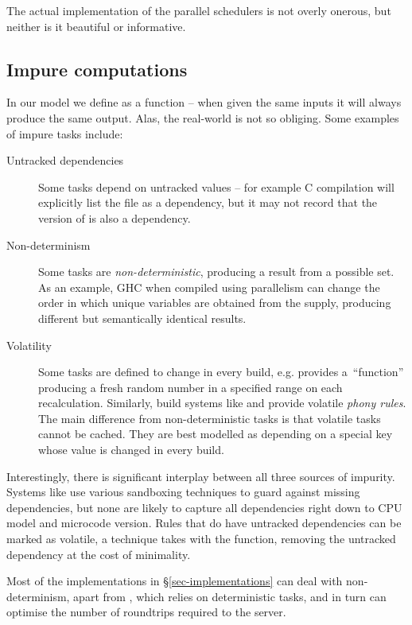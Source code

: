 The actual implementation of the parallel schedulers is not overly onerous,
but neither is it beautiful or informative.

\subsection{Impure computations}\label{sec-non-determinism}

In our model we define  as a function -- when given the same inputs
it will always produce the same output. Alas, the real-world is not so obliging.
Some examples of impure tasks include:

\begin{description}
\item[Untracked dependencies] Some tasks depend on untracked values -- for example
C compilation will explicitly list the  file as a dependency,
but it may not record that the version of  is also a dependency.

\item[Non-determinism] Some tasks are \emph{non-deterministic}, producing a
result from a possible set. As an example, GHC when compiled using parallelism
can change the order in which unique variables are obtained from the supply,
producing different but semantically identical results.

\item[Volatility] Some tasks are defined to change in every build, e.g. \Excel
provides a~``function''  producing a fresh random number in a
specified range on each recalculation. Similarly, build systems like \Make and
\Shake provide volatile \emph{phony rules}. The main difference from
non-deterministic tasks is that volatile tasks cannot be cached. They are best
modelled as depending on a special key  whose value is changed
in every build.
\end{description}

Interestingly, there is significant interplay between all three sources of
impurity. Systems like \Bazel use various sandboxing techniques to guard against
missing dependencies, but none are likely to capture all dependencies right down
to CPU model and microcode version. Rules that do have untracked dependencies can be
marked as volatile, a technique \Excel takes with the  function,
removing the untracked dependency at the cost of minimality.

Most of the implementations in \S\ref{sec-implementations} can deal with
non-determinism, apart from \Buck, which relies on deterministic tasks, and
in turn can optimise the number of roundtrips required to the server.

